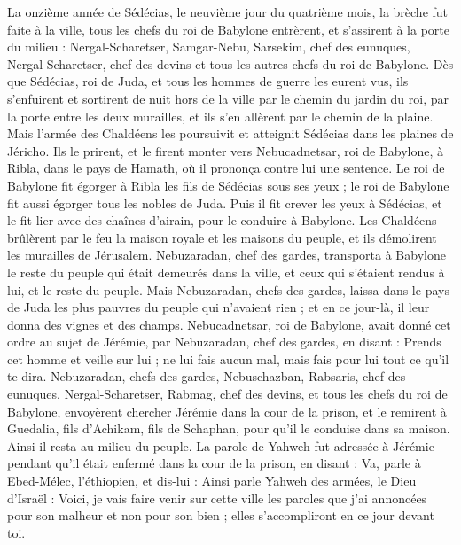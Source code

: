 \begin{multicols}{2}
La onzième année de Sédécias, le neuvième jour du quatrième mois, la brèche fut faite à la ville,
tous les chefs du roi de Babylone entrèrent, et s'assirent à la porte du milieu : Nergal-Scharetser, Samgar-Nebu, Sarsekim, chef des eunuques, Nergal-Scharetser, chef des devins et tous les autres chefs du roi de Babylone.
Dès que Sédécias, roi de Juda, et tous les hommes de guerre les eurent vus, ils s'enfuirent et sortirent de nuit hors de la ville par le chemin du jardin du roi, par la porte entre les deux murailles, et ils s'en allèrent par le chemin de la plaine.
Mais l'armée des Chaldéens les poursuivit et atteignit Sédécias dans les plaines de Jéricho. Ils le prirent, et le firent monter vers Nebucadnetsar, roi de Babylone, à Ribla, dans le pays de Hamath, où il prononça contre lui une sentence.
Le roi de Babylone fit égorger à Ribla les fils de Sédécias sous ses yeux ; le roi de Babylone fit aussi égorger tous les nobles de Juda.
Puis il fit crever les yeux à Sédécias, et le fit lier avec des chaînes d'airain, pour le conduire à Babylone.
Les Chaldéens brûlèrent par le feu la maison royale et les maisons du peuple, et ils démolirent les murailles de Jérusalem.
Nebuzaradan, chef des gardes, transporta à Babylone le reste du peuple qui était demeurés dans la ville, et ceux qui s'étaient rendus à lui, et le reste du peuple.
Mais Nebuzaradan, chefs des gardes, laissa dans le pays de Juda les plus pauvres du peuple qui n’avaient rien ; et en ce jour-là, il leur donna des vignes et des champs.
Nebucadnetsar, roi de Babylone, avait donné cet ordre au sujet de Jérémie, par Nebuzaradan, chef des gardes, en disant :
Prends cet homme et veille sur lui ;  ne lui fais aucun mal, mais fais pour lui tout ce qu'il te dira.
Nebuzaradan, chefs des gardes, Nebuschazban, Rabsaris, chef des eunuques, Nergal-Scharetser, Rabmag,  chef des devins, et tous les chefs du roi de Babylone,
envoyèrent chercher Jérémie dans la cour de la prison, et le remirent à Guedalia, fils d'Achikam, fils de Schaphan, pour qu’il le conduise dans sa maison. Ainsi il resta au milieu du peuple.
La parole de Yahweh fut adressée à Jérémie pendant qu'il était enfermé dans la cour de la prison, en disant :
Va,  parle à Ebed-Mélec, l’éthiopien, et dis-lui : Ainsi parle Yahweh des armées, le Dieu d'Israël : Voici, je vais faire venir sur cette ville les paroles que j’ai annoncées pour son malheur et non pour son bien ; elles s’accompliront en ce jour devant toi.

\end{multicols}
